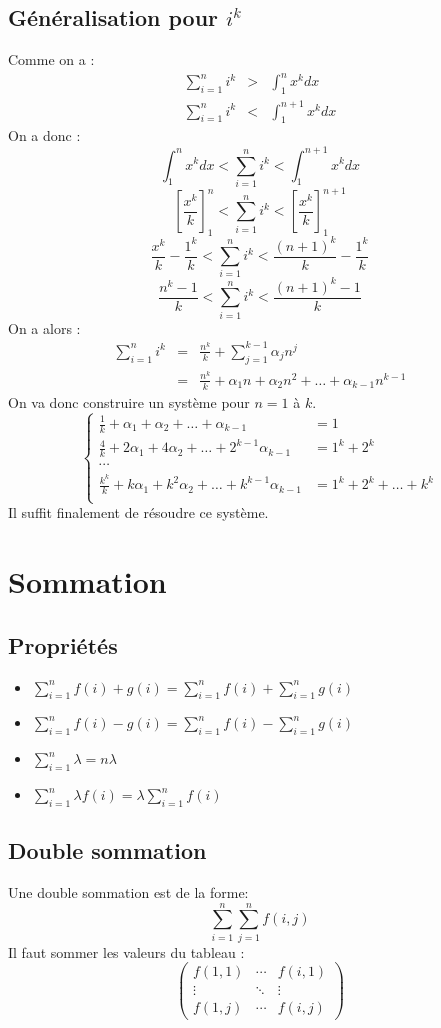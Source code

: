 \documentclass[a4paper,10pt]{report}
\begin{document}
\subsection{Généralisation pour $i^k$}
Comme on a :
\begin{eqnarray*}
\sum_{i=1}^{n} i^k & >  & \int_{1}^{n} x^k dx\\
\sum_{i=1}^{n} i^k & < & \int_{1}^{n+1} x^k dx
\end{eqnarray*}
On a donc :
$$\int_{1}^{n} x^k dx < \sum_{i=1}^{n} i^k < \int_{1}^{n+1} x^k dx$$
$${\left[ \frac{x^k}{k} \right]}_{1}^{n} < \sum_{i=1}^{n} i^k < {\left[ \frac{x^k}{k} \right]}_{1}^{n+1}$$
$$\frac{x^k}{k} - \frac{1^k}{k} < \sum_{i=1}^{n} i^k < \frac{(n+1)^k}{k}-\frac{1^k}{k}$$
$$\frac{n^k-1}{k} < \sum_{i=1}^{n} i^k < \frac{(n+1)^k-1}{k}$$
On a alors :
\begin{eqnarray*}
\sum_{i=1}^{n} i^k & = & \frac{n^k}{k} + \sum_{j=1}^{k-1} \alpha_j n^j\\
& = & \frac{n^k}{k} + \alpha_1 n + \alpha_2 n^2 + \ldots + \alpha_{k-1} n^{k-1}
\end{eqnarray*}
On va donc construire un système pour $n=1$ à $k$.
$$\left\{\begin{array}{ll}
 \frac{1}{k} + \alpha_1 + \alpha_2 + \ldots + \alpha_{k-1} & = 1\\
 \frac{4}{k} + 2 \alpha_1 + 4 \alpha_2 + \ldots + 2^{k-1} \alpha_{k-1} & = 1^k + 2^k\\
 \cdots\\
 \frac{k^k}{k} + k \alpha_1 + k^2 \alpha_2 + \ldots + k^{k-1} \alpha_{k-1} & = 1^k + 2^k + \ldots + k^k \\
 \end{array}\right.$$
Il suffit finalement de résoudre ce système.
\section{Sommation}
\subsection{Propriétés}
\begin{itemize}
\item{$\sum_{i=1}^{n} f(i) + g(i) = \sum_{i=1}^{n} f(i) + \sum_{i=1}^{n} g(i)$}
\item{$\sum_{i=1}^{n} f(i) - g(i) = \sum_{i=1}^{n} f(i) - \sum_{i=1}^{n} g(i)$}
\item{$\sum_{i=1}^{n} \lambda = n \lambda$}
\item{$\sum_{i=1}^{n} \lambda f(i) = \lambda \sum_{i=1}^{n} f(i)$}
\end{itemize}
\subsection{Double sommation}
Une double sommation est de la forme:
$$\sum_{i=1}^{n}\sum_{j=1}^{n} f(i,j)$$
Il faut sommer les valeurs du tableau :
$$\begin{pmatrix}
f(1,1) & \cdots & f(i,1)\\
\vdots & \ddots & \vdots\\
f(1,j) & \cdots & f(i,j)
\end{pmatrix}$$
\end{document}
